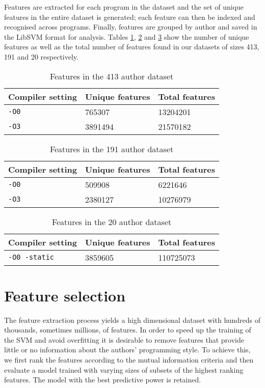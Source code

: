 \documentclass[a4paper,11pt]{kth-mag}
\begin{document}
Features are extracted for each program in the dataset and the set of unique
features in the entire dataset is generated; each feature can then be indexed
and recognised across programs. Finally, features are grouped by author and
saved in the LibSVM format %
for analysis. Tables \ref{tab:413-features},
\ref{tab:191-features} and \ref{tab:20-features} show the number of unique
features as well as the total number of features found in our datasets of sizes
413, 191 and 20 respectively.   

\begin{table}[!htb]
    \centering
        \begin{tabular}{ l l l }
        Compiler setting & Unique features & Total features \\ \hline
        \lstinline{-O0} & 765307 & 13204201 \\
        \lstinline{-O3} & 3891494 & 21570182
        \end{tabular}
    \caption{Features in the 413 author dataset}
    \label{tab:413-features}
\end{table}

\begin{table}[!htb]
    \centering
        \begin{tabular}{ l l l }
        Compiler setting & Unique features & Total features \\ \hline
        \lstinline{-O0} & 509908 & 6221646 \\
        \lstinline{-O3} & 2380127 & 10276979
        \end{tabular}
    \caption{Features in the 191 author dataset}
    \label{tab:191-features}
\end{table}

\begin{table}[!htb]
    \centering
        \begin{tabular}{ l l l }
        Compiler setting & Unique features & Total features \\ \hline
        \lstinline{-O0 -static} & 3859605 & 110725073 \\
        \end{tabular}
    \caption{Features in the 20 author dataset}
    \label{tab:20-features}
\end{table}

\section{Feature selection}
The feature extraction process yields a high dimensional dataset with hundreds
of thousands, sometimes millions, of features. In order to speed up the
training of the SVM and avoid overfitting it is desirable to remove features
that provide little or no information about the authors’ programming style. To
achieve this, we first rank the features according to the mutual information
criteria \parencite{guyon2003introduction} and then evaluate a model trained
with varying sizes of subsets of the highest ranking features. The model with
the best predictive power is retained.
\end{document}
